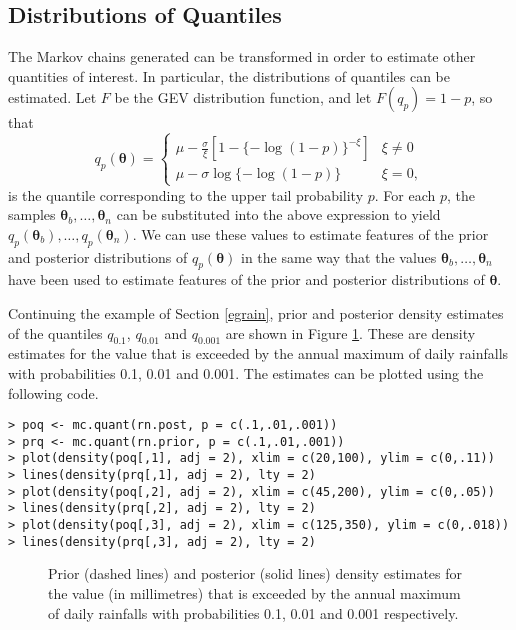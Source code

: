 \documentclass[11pt,a4paper]{article}
\newcommand{\bs}{\boldsymbol}
\begin{document}
\subsection{Distributions of Quantiles}
\label{quantiles}

The Markov chains generated can be transformed in order to estimate other quantities of interest.
In particular, the distributions of quantiles can be estimated.
Let $F$ be the GEV distribution function, and let $F(q_p) = 1-p$, so that
\begin{equation*}
q_p(\bs{\theta}) = 
\begin{cases}
\mu - \frac{\sigma}{\xi}[1 - \{-\log(1-p)\}^{-\xi}] & \xi \neq 0 \\
\mu - \sigma \log\{-\log(1-p)\} & \xi = 0,
\end{cases}
\end{equation*}
is the quantile corresponding to the upper tail probability $p$.
For each $p$, the samples $\bs{\theta}_b, \dots, \bs{\theta}_n$ can be substituted into the above expression to yield $q_p(\bs{\theta}_b), \dots, q_p(\bs{\theta}_n)$.
We can use these values to estimate features of the prior and posterior distributions of $q_p(\bs{\theta})$ in the same way that the values $\bs{\theta}_b, \dots, \bs{\theta}_n$ have been used to estimate features of the prior and posterior distributions of $\bs{\theta}$.

Continuing the example of Section \ref{egrain}, prior and posterior density estimates of the quantiles $q_{0.1}$, $q_{0.01}$  and $q_{0.001}$ are shown in Figure \ref{pqrain}.
These are density estimates for the value that is exceeded by the annual maximum of daily rainfalls with probabilities 0.1, 0.01 and 0.001.
The estimates can be plotted using the following code.

\begin{verbatim}
> poq <- mc.quant(rn.post, p = c(.1,.01,.001))
> prq <- mc.quant(rn.prior, p = c(.1,.01,.001))
> plot(density(poq[,1], adj = 2), xlim = c(20,100), ylim = c(0,.11))
> lines(density(prq[,1], adj = 2), lty = 2)
> plot(density(poq[,2], adj = 2), xlim = c(45,200), ylim = c(0,.05))
> lines(density(prq[,2], adj = 2), lty = 2)
> plot(density(poq[,3], adj = 2), xlim = c(125,350), ylim = c(0,.018))
> lines(density(prq[,3], adj = 2), lty = 2)
\end{verbatim}

\begin{figure}
\begin{center}
\vspace{-1.5cm}
\hspace{0cm}
\hspace{0cm}
\end{center}
\caption{Prior (dashed lines) and posterior (solid lines) density estimates for the value (in millimetres) that is exceeded by the annual maximum of daily rainfalls with probabilities 0.1, 0.01 and 0.001 respectively.}
\label{pqrain}
\end{figure}
\end{document}
